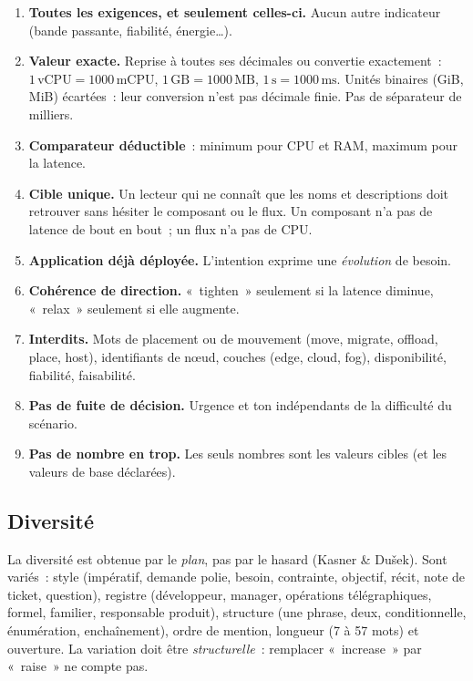 \documentclass[11pt,a4paper]{article}
\begin{document}
\begin{enumerate}
  \item \textbf{Toutes les exigences, et seulement celles-ci.} Aucun autre indicateur (bande passante, fiabilité, énergie\dots).
  \item \textbf{Valeur exacte.} Reprise à toutes ses décimales ou convertie exactement~: $1\,\text{vCPU}=1000\,\text{mCPU}$, $1\,\text{GB}=1000\,\text{MB}$, $1\,\text{s}=1000\,\text{ms}$. Unités binaires (GiB, MiB) écartées~: leur conversion n'est pas décimale finie. Pas de séparateur de milliers.
  \item \textbf{Comparateur déductible}~: minimum pour CPU et RAM, maximum pour la latence.
  \item \textbf{Cible unique.} Un lecteur qui ne connaît que les noms et descriptions doit retrouver sans hésiter le composant ou le flux. Un composant n'a pas de latence de bout en bout~; un flux n'a pas de CPU.
  \item \textbf{Application déjà déployée.} L'intention exprime une \emph{évolution} de besoin.
  \item \textbf{Cohérence de direction.} «~tighten~» seulement si la latence diminue, «~relax~» seulement si elle augmente.
  \item \textbf{Interdits.} Mots de placement ou de mouvement (move, migrate, offload, place, host), identifiants de nœud, couches (edge, cloud, fog), disponibilité, fiabilité, faisabilité.
  \item \textbf{Pas de fuite de décision.} Urgence et ton indépendants de la difficulté du scénario.
  \item \textbf{Pas de nombre en trop.} Les seuls nombres sont les valeurs cibles (et les valeurs de base déclarées).
\end{enumerate}

\subsection{Diversité}

La diversité est obtenue par le \emph{plan}, pas par le hasard (Kasner \& Dušek). Sont variés~: style (impératif, demande polie, besoin, contrainte, objectif, récit, note de ticket, question), registre (développeur, manager, opérations télégraphiques, formel, familier, responsable produit), structure (une phrase, deux, conditionnelle, énumération, enchaînement), ordre de mention, longueur (7 à 57 mots) et ouverture. La variation doit être \emph{structurelle}~: remplacer «~increase~» par «~raise~» ne compte pas.
\end{document}
